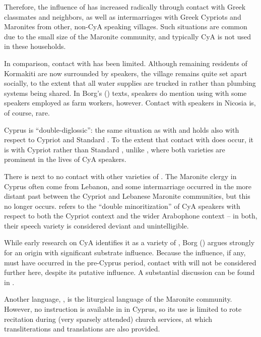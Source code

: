 \documentclass[output=paper]{langsci/langscibook}
\begin{document}
Therefore, the influence of  has increased radically through contact with Greek classmates and neighbors, as well as intermarriages with Greek Cypriots and Maronites from other, non-CyA speaking villages. Such situations are common due to the small size of the Maronite community, and typically CyA is not used in these households.


In comparison, contact with  has been limited. Although remaining residents of {Kormakiti} are now surrounded by  speakers, the village remains quite set apart socially, to the extent that all water supplies are trucked in rather than plumbing systems being shared. In Borg's (\citeyear{Borg1985}) texts, speakers do mention using  with some speakers employed as farm workers, however. Contact with  speakers in Nicosia is, of course, rare.

{Cyprus} is “double-diglossic”: the same situation as with  and  holds also with respect to Cypriot and {Standard} . To the extent that contact with  does occur, it is with Cypriot  rather than {Standard} , unlike , where both varieties are prominent in the lives of CyA speakers.

There is next to no contact with other varieties of . The Maronite clergy in {Cyprus} often come from Lebanon, and some intermarriage occurred in the more distant past between the Cypriot and Lebanese Maronite communities, but this no longer occurs. \citet{Roth2004} refers to the “double {minoritization}” of CyA speakers with respect to both the Cypriot context and the wider Arabophone context – in both, their speech variety is considered deviant and unintelligible.


While early research on CyA identifies it as a  variety of  \citep{Tsiapera1969}, Borg (\citeyear{Borg1985,Borg2004}) argues strongly for an  origin with significant  {substrate} influence. Because the  influence, if any, must have occurred in the pre-{Cyprus} period, contact with  will not be considered further here, despite its putative influence. A substantial discussion can be found in \citet{Borg2004}.

Another  language, , is the liturgical language of the Maronite community. However, no instruction is available in  in {Cyprus}, so its use is limited to rote recitation during (very sparsely attended) church services, at which transliterations and  translations are also provided.
\end{document}
